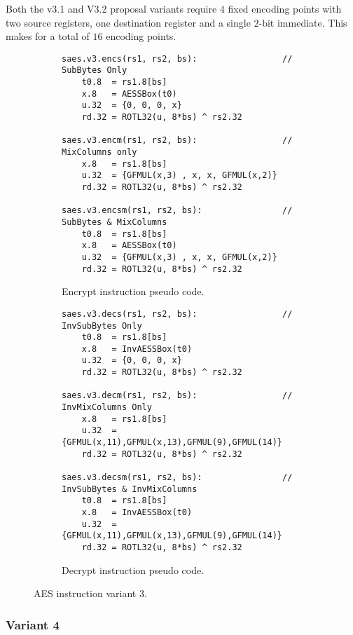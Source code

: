 Both the v3.1 and V3.2 proposal variants require $4$ fixed encoding
points with two source registers, one destination register and
a single $2$-bit immediate.
This makes for a total of $16$ encoding points.

\begin{figure}
\begin{subfigure}[b]{1.0\textwidth}
\begin{lstlisting}
saes.v3.encs(rs1, rs2, bs):                 // SubBytes Only
    t0.8  = rs1.8[bs]
    x.8   = AESSBox(t0)
    u.32  = {0, 0, 0, x}
    rd.32 = ROTL32(u, 8*bs) ^ rs2.32

saes.v3.encm(rs1, rs2, bs):                 // MixColumns only
    x.8   = rs1.8[bs]
    u.32  = {GFMUL(x,3) , x, x, GFMUL(x,2)}
    rd.32 = ROTL32(u, 8*bs) ^ rs2.32

saes.v3.encsm(rs1, rs2, bs):                // SubBytes & MixColumns
    t0.8  = rs1.8[bs]
    x.8   = AESSBox(t0)
    u.32  = {GFMUL(x,3) , x, x, GFMUL(x,2)}
    rd.32 = ROTL32(u, 8*bs) ^ rs2.32
\end{lstlisting}
\caption{Encrypt instruction pseudo code.}
\label{fig:pesudo:aes:v3:enc}
\end{subfigure}

\begin{subfigure}[b]{1.0\textwidth}
\begin{lstlisting}
saes.v3.decs(rs1, rs2, bs):                 // InvSubBytes Only
    t0.8  = rs1.8[bs]
    x.8   = InvAESSBox(t0)
    u.32  = {0, 0, 0, x}
    rd.32 = ROTL32(u, 8*bs) ^ rs2.32

saes.v3.decm(rs1, rs2, bs):                 // InvMixColumns Only
    x.8   = rs1.8[bs]
    u.32  = {GFMUL(x,11),GFMUL(x,13),GFMUL(9),GFMUL(14)}
    rd.32 = ROTL32(u, 8*bs) ^ rs2.32

saes.v3.decsm(rs1, rs2, bs):                // InvSubBytes & InvMixColumns
    t0.8  = rs1.8[bs]
    x.8   = InvAESSBox(t0)
    u.32  = {GFMUL(x,11),GFMUL(x,13),GFMUL(9),GFMUL(14)}
    rd.32 = ROTL32(u, 8*bs) ^ rs2.32
\end{lstlisting}
\caption{Decrypt instruction pseudo code.}
\label{fig:pesudo:aes:v3:dec}
\end{subfigure}
\caption{AES instruction variant 3.}
\label{fig:pseudo:aes:v3}
\end{figure}



\subsubsection{Variant 4}

